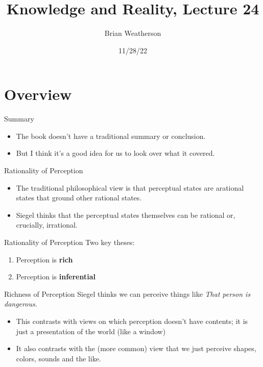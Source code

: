 \documentclass[
  17pt,
  letterpaper,
  ignorenonframetext,
  aspectratio=169,
  handout,
  xcolor={dvipsnames}]{beamer}
\title{Knowledge and Reality, Lecture 24}
\author{Brian Weatherson}
\date{11/28/22}
\providecommand{\tightlist}{%
  \setlength{\itemsep}{0pt}\setlength{\parskip}{0pt}}\usepackage{longtable,booktabs,array}
\begin{document}
\frame{\titlepage}
\ifdefined\Shaded\renewenvironment{Shaded}{\begin{tcolorbox}[boxrule=0pt, frame hidden, borderline west={3pt}{0pt}{shadecolor}, enhanced, breakable, interior hidden, sharp corners]}{\end{tcolorbox}}\fi

\hypertarget{overview}{%
\section{Overview}\label{overview}}

\begin{frame}{Summary}
\protect\hypertarget{summary}{}
\begin{itemize}[<+->]
\tightlist
\item
  The book doesn't have a traditional summary or conclusion.
\item
  But I think it's a good idea for us to look over what it covered.
\end{itemize}
\end{frame}

\begin{frame}{Rationality of Perception}
\protect\hypertarget{rationality-of-perception}{}
\begin{itemize}[<+->]
\tightlist
\item
  The traditional philosophical view is that perceptual states are
  arational states that ground other rational states.
\item
  Siegel thinks that the perceptual states themselves can be rational
  or, crucially, irrational.
\end{itemize}
\end{frame}

\begin{frame}{Rationality of Perception}
\protect\hypertarget{rationality-of-perception-1}{}
Two key theses:

\begin{enumerate}[<+->]
\tightlist
\item
  Perception is \textbf{rich}
\item
  Perception is \textbf{inferential}
\end{enumerate}
\end{frame}

\begin{frame}{Richness of Perception}
\protect\hypertarget{richness-of-perception}{}
Siegel thinks we can perceive things like \emph{That person is
dangerous}.

\begin{itemize}[<+->]
\tightlist
\item
  This contrasts with views on which perception doesn't have contents;
  it is just a presentation of the world (like a window)
\item
  It also contrasts with the (more common) view that we just perceive
  shapes, colors, sounds and the like.
\end{itemize}
\end{frame}
\end{document}
